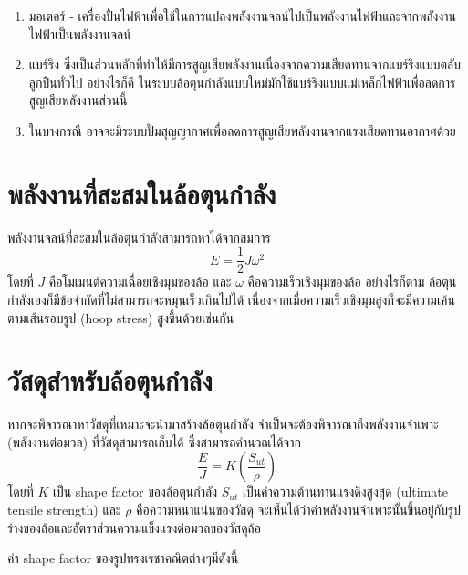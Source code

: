 \documentclass[a4paper,nobib,openany]{tufte-book}
\begin{document}
\begin{enumerate}
\item มอเตอร์ -
เครื่องปั่นไฟฟ้าเพื่อใช้ในการแปลงพลังงานจลน์ไปเป็นพลังงานไฟฟ้าและจากพลังงานไฟฟ้าเป็นพลังงานจลน์

\item แบร์ริง
ซึ่งเป็นส่วนหลักที่ทำให้มีการสูญเสียพลังงานเนื่องจากความเสียดทานจากแบร์ริงแบบตลับลูกปืนทั่วไป
อย่างไรก็ดี
ในระบบล้อตุนกำลังแบบใหม่มักใช้แบร์ริงแบบแม่เหล็กไฟฟ้าเพื่อลดการสูญเสียพลังงานส่วนนี้

\item ในบางกรณี
อาจจะมีระบบปั๊มสุญญากาศเพื่อลดการสูญเสียพลังงานจากแรงเสียดทานอากาศด้วย
\end{enumerate}

\section{พลังงานที่สะสมในล้อตุนกำลัง}
\label{sec:orgdd44cfc}
พลังงานจลน์ที่สะสมในล้อตุนกำลังสามารถหาได้จากสมการ
\[E = \frac{1}{2}J \omega^2\] โดยที่ \(J\)
คือโมเมนต์ความเฉื่อยเชิงมุมของล้อ และ \(\omega\)
คือความเร็วเชิงมุมของล้อ อย่างไรก็ตาม
ล้อตุนกำลังเองก็มีข้อจำกัดที่ไม่สามารถจะหมุนเร็วเกินไปได้
เนื่องจากเมื่อความเร็วเชิงมุมสูงก็จะมีความเค้นตามเส้นรอบรูป (hoop
stress) สูงขึ้นด้วยเช่นกัน

\section{วัสดุสำหรับล้อตุนกำลัง}
\label{sec:orgdc5e844}
หากจะพิจารณาหาวัสดุที่เหมาะจะนำมาสร้างล้อตุนกำลัง
จำเป็นจะต้องพิจารณาถึงพลังงานจำเพาะ (พลังงานต่อมวล)
ที่วัสดุสามารถเก็บได้ ซึ่งสามารถคำนวณได้จาก
\[\frac{E}{J} = K \left( \frac{S_{ut}}{\rho} \right)\] โดยที่ \(K\) เป็น
shape factor ของล้อตุนกำลัง \(S_{ut}\) เป็นค่าความต้านทานแรงดึงสูงสุด
(ultimate tensile strength) และ \(\rho\) คือความหนาแน่นของวัสดุ
จะเห็นได้ว่าค่าพลังงานจำเพาะนั้นขึ้นอยู่กับรูปร่างของล้อและอัตราส่วนความแข็งแรงต่อมวลของวัสดุล้อ

ค่า shape factor ของรูปทรงเรชาคณิตต่างๆมีดังนี้
\end{document}
